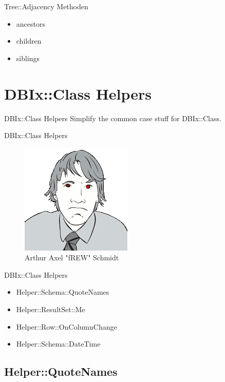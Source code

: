\begin{frame}{Tree::Adjacency Methoden}
\begin{itemize}
\item ancestors
\item children
\item siblings
\end{itemize}
\end{frame}

\section{DBIx::Class Helpers}

\begin{frame}{DBIx::Class Helpers}
Simplify the common case stuff for DBIx::Class.
\end{frame}

\begin{frame}{DBIx::Class Helpers}
\begin{figure}[!ht]
\centering
\includegraphics[width=0.4\linewidth]{img/frew.png}
\caption{Arthur Axel "fREW" Schmidt}
\end{figure}
\end{frame}


\begin{frame}{DBIx::Class Helpers}
\begin{itemize}
\item Helper::Schema::QuoteNames
\item Helper::ResultSet::Me
\item Helper::Row::OnColumnChange
\item Helper::Schema::DateTime
\end{itemize}
\end{frame}

\subsection{Helper::QuoteNames}

